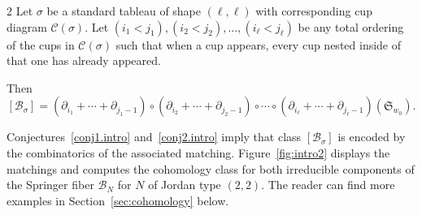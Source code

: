 \documentclass[11pt]{amsart}
\theoremstyle{remark}
\theoremstyle{remark}
\theoremstyle{definition}
\theoremstyle{definition}
\theoremstyle{definition}
\numberwithin{equation}{section}
\newcommand{\gs}{\sigma}
\newcommand{\cc}{\mathcal{C}}
\newcommand{\SF}{\mathcal{B}}
\newcommand{\cupsigma}{\cc(\gs)}
\begin{document}
\begin{customconj}{2} \label{conj2.intro} Let $\gs$ be a standard tableau of shape $(\ell,\ell)$ with corresponding cup diagram $\cupsigma$. Let $(i_1<j_1), (i_2<j_2), \ldots, (i_\ell<j_\ell)$ be any total ordering of the cups in $\cupsigma$ such that when a cup appears, every cup nested inside of that one has already appeared. 

Then 
\[
[\SF_\gs] = \left( \partial_{i_1} + \cdots + \partial_{j_1-1} \right)\circ \left( \partial_{i_2} + \cdots + \partial_{j_2-1} \right)\circ \cdots \circ \left( \partial_{i_\ell} + \cdots + \partial_{j_\ell-1} \right)(\mathfrak{S}_{w_0}).
\]
\end{customconj}


Conjectures~\ref{conj1.intro} and~\ref{conj2.intro} imply that class $[\SF_\gs]$ is encoded by the combinatorics of the associated matching. Figure~\ref{fig:intro2} displays the matchings and computes the cohomology class for both irreducible components of the Springer fiber $\SF_N$ for $N$ of Jordan type $(2,2)$. The reader can find more examples in Section~\ref{sec:cohomology} below. 
\end{document}
